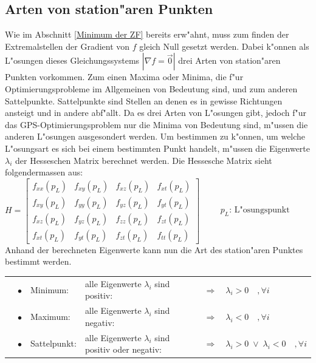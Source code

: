 	\subsection{Arten von station"aren Punkten}\label{stat_Punkte}
		Wie im Abschnitt \ref{Minimum der ZF} bereits erw"ahnt, muss zum finden der Extremalstellen der Gradient von $f$ gleich Null gesetzt werden. Dabei k"onnen als L"osungen dieses Gleichungssystems $|\nabla f = \vec 0 |$ drei Arten von station"aren Punkten vorkommen. Zum einen Maxima oder Minima, die f"ur Optimierungsprobleme im Allgemeinen von Bedeutung sind, und zum anderen Sattelpunkte. Sattelpunkte sind Stellen an denen es in gewisse Richtungen ansteigt und in andere abf"allt. Da es drei Arten von L"osungen gibt, jedoch f"ur das GPS-Optimierungsproblem nur die Minima von Bedeutung sind, m"ussen die anderen L"osungen ausgesondert werden. Um bestimmen zu k"onnen, um welche L"osungsart es sich bei einem bestimmten Punkt handelt, m"ussen die Eigenwerte $\lambda_i$ der Hesseschen Matrix berechnet werden. Die Hessesche Matrix sieht folgendermassen aus:\\[0.2cm]
		$H = \begin{bmatrix} 
		f_{xx}(p_L) & f_{xy}(p_L) & f_{xz}(p_L) & f_{xt}(p_L)\\
		f_{xy}(p_L) & f_{yy}(p_L) & f_{yz}(p_L) & f_{yt}(p_L)\\
		f_{xz}(p_L) & f_{yz}(p_L) & f_{zz}(p_L) & f_{zt}(p_L)\\
		f_{xt}(p_L) & f_{yt}(p_L) & f_{zt}(p_L) & f_{tt}(p_L)
		\end{bmatrix} \qquad\begin{array}{l} p_L\text{: L"osungspunkt}\end{array}$\\[0.2cm]
		Anhand der berechneten Eigenwerte kann nun die Art des station"aren Punktes bestimmt werden.\\[0.2cm]
		\begin{tabular}{lcllcl}
			& $\bullet$ & Minimum: & alle Eigenwerte $\lambda_i$ sind positiv: & $\Rightarrow$ & $\lambda_i > 0\quad,\forall i$\\
			& $\bullet$ & Maximum: & alle Eigenwerte $\lambda_i$ sind negativ: & $\Rightarrow$ & $\lambda_i < 0\quad,\forall i$\\
			& $\bullet$ & Sattelpunkt: & alle Eigenwerte $\lambda_i$ sind positiv oder negativ: & $\Rightarrow$ & $\lambda_i > 0 \;\lor\; \lambda_i < 0\quad,\forall i$\\
		\end{tabular}

